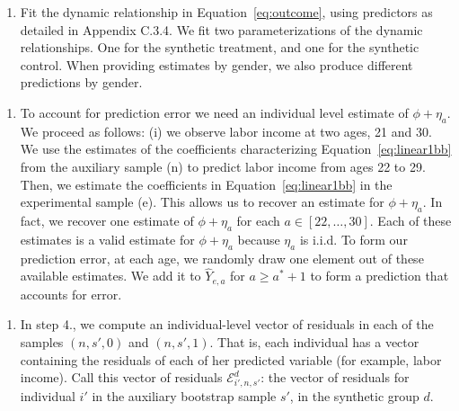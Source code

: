 \documentclass[static]{JJH-Beamer}
\begin{document}
\begin{frame}

\begin{enumerate}[4.]
\item Fit the dynamic relationship in Equation~\eqref{eq:outcome}, using predictors as detailed in Appendix C.3.4. We fit two parameterizations of the dynamic relationships. One for the synthetic treatment, and one for the synthetic control. When providing estimates by gender, we also produce different predictions by gender.
\end{enumerate}

\end{frame}

\begin{frame}

\begin{enumerate}[5.]
\item To account for prediction error we need an individual level estimate of $ \phi + \eta_{a}$. We proceed as follows: (i) we observe labor income at two ages, 21 and 30. We use the estimates of the coefficients characterizing Equation~\eqref{eq:linear1bb} from the auxiliary sample (n) to predict labor income from ages 22 to 29. Then, we estimate the coefficients in Equation~\eqref{eq:linear1bb} in the experimental sample (e). This allows us to recover an estimate for $\phi + \eta_{a}$. In fact, we recover one estimate of $\phi + \eta_{a}$ for each $a \in \left[22, \ldots, 30 \right]$. Each of these estimates is a valid estimate for $\phi + \eta_{a}$ because $\eta_{a}$ is i.i.d. To form our prediction error, at each age, we randomly draw one element out of these available estimates. We add it to  $\hat{Y}_{e,a}$ for $a \geq a^* + 1$ to form a prediction that accounts for error.
\end{enumerate}

\end{frame}

\begin{frame}

\begin{enumerate}[6.]
\item In step 4., we compute an individual-level vector of residuals in each of the samples $(n,s',0)$ and $(n,s',1)$. That is, each individual has a vector containing the residuals of each of her predicted variable (for example, labor income). Call this vector of residuals $\bm{\mathcal{E}}_{i',n,s'}^d$: the vector of residuals for individual $i'$ in the auxiliary bootstrap sample $s'$, in the synthetic group $d$.
\end{enumerate}

\end{frame}
\end{document}
